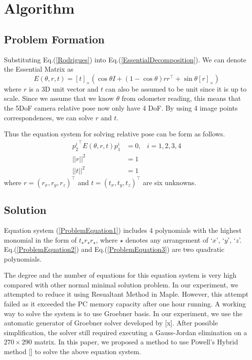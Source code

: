 \documentclass[letterpaper, 10 pt, conference]{ieeeconf}
\begin{document}
\section{Algorithm}
\label{Algorithm}

\subsection{Problem Formation}
Substituting Eq.(\ref{Rodrigues}) into Eq.(\ref{EssentialDecomposition}). We can denote the Essential Matrix as 
\begin{equation}
E(\theta, r, t) = [t]_\times \left( \cos \theta I + (1 - \cos \theta) r r^\top + \sin \theta [ r ]_\times \right)
\end{equation}
where $r$ is a 3D unit vector and $t$ can also be assumed to be unit since it is up to scale. Since we assume that we know $\theta$ from odometer reading, this means that the 5DoF camera relative pose now only have 4 DoF. By using 4 image points correspondences, we can solve $r$ and $t$. 

Thus the equation system for solving relative pose can be form as follows. 
\begin{eqnarray}
\label{ProblemEquation1}
{p_2^i}^\top E(\theta, r, t) p_1^i & = 0,& i = 1, 2, 3, 4 \\
\label{ProblemEquation2}
|| r ||^2 & = 1 & \\
\label{ProblemEquation3}
|| t ||^2 & = 1 &
\end{eqnarray}
where $r = (r_x, r_y, r_z)^\top$ and $t = (t_x, t_y, t_z)^\top$ are six unknowns. 

\subsection{Solution}
\label{Solution}
Equation system (\ref{ProblemEquation1}) includes 4 polynomials with the highest monomial in the form of $t_\star r_\star r_\star$, where $\star$ denotes any arrangement of `$x$', `$y$', `$z$'. Eq.(\ref{ProblemEquation2}) and Eq.(\ref{ProblemEquation3}) are two quadratic polynomials. 

The degree and the number of equations for this equation system is very high  compared with other normal minimal solution problem. In our experiment, we attempted to reduce it using Resualtant Method in Maple. However, this attempt failed as it exceeded the PC memory capacity after one hour running. A working way to solve the system is to use Groebner basis. In our experiment, we use the automatic generator of Groebner solver developed by [x]. After possible simplification, the solver still required executing a Gauss-Jordan elimination on a $270 \times 290$ matrix. In this paper, we proposed a method to use Powell's Hybrid method [] to solve the above equation system. 
\end{document}
